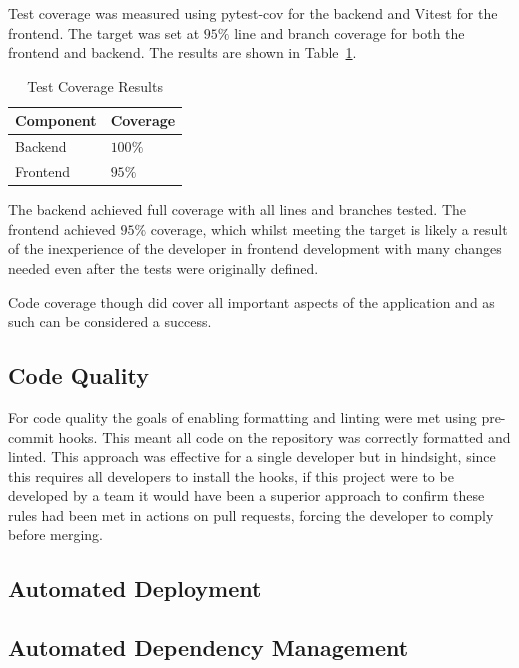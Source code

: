 Test coverage was measured using pytest-cov for the backend and Vitest for the frontend. The target was set at $95\%$ line and branch coverage for both the frontend and backend. The results are shown in Table~\ref{tab:test-coverage-results}.
\begin{table} [H]
    \centering
    \begin{tabular}{|m{3cm}|m{3cm}|}
        \hline
        \textbf{Component} & \textbf{Coverage} \\
        \hline
        Backend & $100\%$ \\
        \hline
        Frontend & $95\%$ \\
        \hline
    \end{tabular}
    \caption{Test Coverage Results}
    \label{tab:test-coverage-results}
\end{table}

The backend achieved full coverage with all lines and branches tested. The frontend achieved $95\%$ coverage, which whilst meeting the target is likely a result of the inexperience of the developer in frontend development with many changes needed even after the tests were originally defined.

Code coverage though did cover all important aspects of the application and as such can be considered a success.

\subsection{Code Quality}
For code quality the goals of enabling formatting and linting were met using pre-commit hooks. This meant all code on the repository was correctly formatted and linted. This approach was effective for a single developer but in hindsight, since this requires all developers to install the hooks, if this project were to be developed by a team it would have been a superior approach to confirm these rules had been met in actions on pull requests, forcing the developer to comply before merging.

\subsection{Automated Deployment}

\subsection{Automated Dependency Management}
